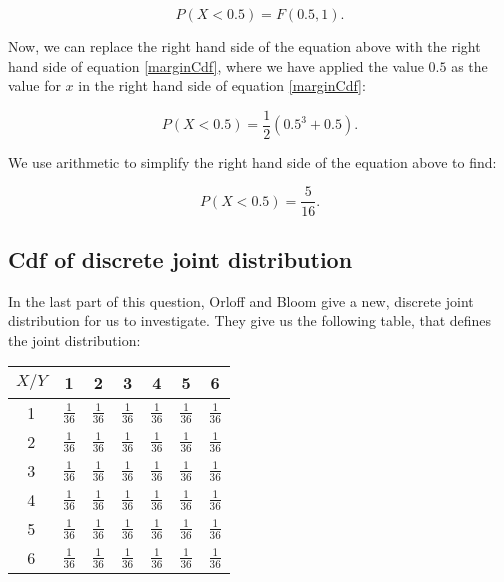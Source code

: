 \documentclass[a4paper,11pt]{article}
\begin{document}
\begin{equation}
P \left( X < 0.5 \right) = F\left(0.5, 1 \right).
\end{equation}

Now, we can replace the right hand side of the equation above with
the right hand side of equation \ref{marginCdf}, where we have
applied the value $0.5$ as the value for $x$ in the right hand
side of equation \ref{marginCdf}:

\begin{equation}
P \left( X < 0.5 \right) = \frac{1}{2}\left( 0.5^{3} + 0.5  \right).
\end{equation}

We use arithmetic to simplify the right hand side of the equation above to
find:

\begin{equation}
P \left( X < 0.5 \right) = \frac{5}{16}.
\end{equation}

\subsection{Cdf of discrete joint distribution}

In the last part of this question, Orloff and Bloom give a new, discrete
joint distribution for us to investigate.  They give us the following
table, that defines the joint distribution:


\begin{center}
  \begin{tabular}{ | c | c | c | c | c | c | c |}
    \hline
    $X/Y$ & 1  & 2  & 3  & 4  & 5  &  6    \\ \hline
    1     &  $\frac{1}{36}$  & $\frac{1}{36}$ & $\frac{1}{36}$ & $\frac{1}{36}$ & $\frac{1}{36}$ & $\frac{1}{36}$   \\ \hline
    2     &  $\frac{1}{36}$  & $\frac{1}{36}$ & $\frac{1}{36}$ & $\frac{1}{36}$ & $\frac{1}{36}$ & $\frac{1}{36}$   \\ \hline
    3     &  $\frac{1}{36}$  & $\frac{1}{36}$ & $\frac{1}{36}$ & $\frac{1}{36}$ & $\frac{1}{36}$ & $\frac{1}{36}$   \\ \hline
    4     &  $\frac{1}{36}$  & $\frac{1}{36}$ & $\frac{1}{36}$ & $\frac{1}{36}$ & $\frac{1}{36}$ & $\frac{1}{36}$   \\ \hline
    5     &  $\frac{1}{36}$  & $\frac{1}{36}$ & $\frac{1}{36}$ & $\frac{1}{36}$ & $\frac{1}{36}$ & $\frac{1}{36}$   \\ \hline
    6     &  $\frac{1}{36}$  & $\frac{1}{36}$ & $\frac{1}{36}$ & $\frac{1}{36}$ & $\frac{1}{36}$ & $\frac{1}{36}$   \\ \hline
  \end{tabular}
\end{center}
\end{document}
